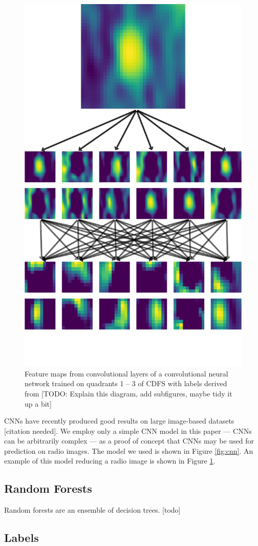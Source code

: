 \documentclass[fleqn,usenatbib,usedcolumn]{mnras}
\begin{document}
    \begin{figure}
    \centering
    \includegraphics[width=0.6\columnwidth]{convolutions_42191.pdf}
    \caption{Feature maps from convolutional layers of a convolutional neural
      network trained on quadrants 1 -- 3 of CDFS with labels derived from
      \citeauthor{norris06} [TODO: Explain this diagram, add subfigures, maybe tidy it up a bit]}
    \label{fig:cnn-outputs}
    \end{figure}

    CNNs have recently produced good results on large image-based datasets [citation needed]. We employ only a simple CNN model in this paper
    --- CNNs can be arbitrarily complex --- as a proof of concept that CNNs
    may be used for prediction on radio images. The model we used is shown
    in Figure \ref{fig:cnn}. An example of this model reducing a radio image is shown in Figure \ref{fig:cnn-outputs}.

  \subsection{Random Forests}\label{random-forests}

    Random forests are an ensemble of decision trees. {[}todo{]}

  \subsection{Labels}\label{labels}
\end{document}
